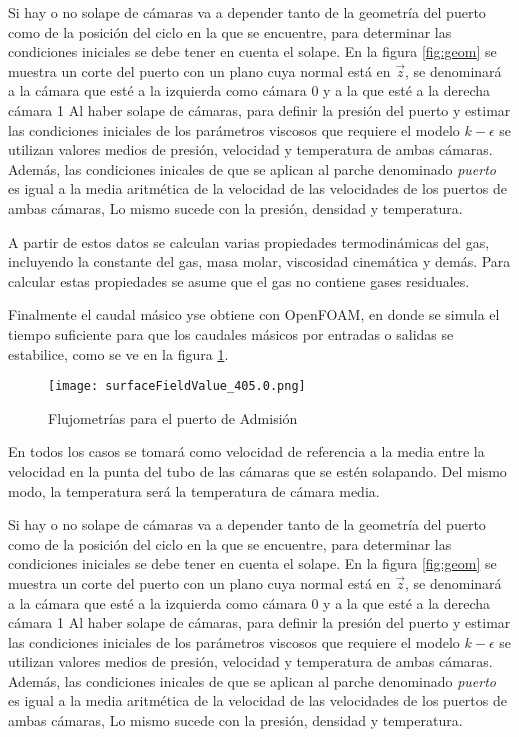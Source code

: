 Si hay o no solape de cámaras va a depender tanto de la geometría del puerto
como de la posición del ciclo en la que se encuentre, para determinar las
condiciones iniciales se debe tener en cuenta el solape.
%
En la figura \ref{fig:geom} se muestra un corte del puerto con un plano cuya
normal está en $\vec{z}$, se denominará a la cámara que esté a la izquierda
como cámara 0 y a la que esté a la derecha cámara 1
%
Al haber solape de cámaras, para definir la presión del puerto y estimar las
condiciones iniciales de los parámetros viscosos que requiere el modelo
$k-\epsilon$ se utilizan valores medios de presión, velocidad y temperatura de
ambas cámaras.
%
Además, las condiciones inicales de que se aplican al parche denominado
\emph{puerto} es igual a la media aritmética de la velocidad de las velocidades
de los puertos de ambas cámaras, Lo mismo sucede con la presión, densidad y
temperatura.

A partir de estos datos se calculan varias propiedades termodinámicas del gas,
incluyendo la constante del gas, masa molar, viscosidad cinemática y demás.
%
Para calcular estas propiedades se asume que el gas no contiene gases
residuales.

Finalmente el caudal másico yse obtiene con OpenFOAM, en donde se simula el
tiempo suficiente para que los caudales másicos por entradas o salidas se
estabilice, como se ve en la figura \ref{fig:caudalMasico}.

\begin{figure}
    \centering
    \texttt{[image: surfaceFieldValue\_405.0.png]}
    \caption{Flujometrías para el puerto de Admisión}
    \label{fig:caudalMasico}
\end{figure}
En todos los casos se tomará como velocidad de referencia a la media entre la
velocidad en la punta del tubo de las cámaras que se estén solapando.
%
Del mismo modo, la temperatura será la temperatura de cámara media.

Si hay o no solape de cámaras va a depender tanto de la geometría del puerto
como de la posición del ciclo en la que se encuentre, para determinar las
condiciones iniciales se debe tener en cuenta el solape.
%
En la figura \ref{fig:geom} se muestra un corte del puerto con un plano cuya
normal está en $\vec{z}$, se denominará a la cámara que esté a la izquierda
como cámara 0 y a la que esté a la derecha cámara 1
%
Al haber solape de cámaras, para definir la presión del puerto y estimar las
condiciones iniciales de los parámetros viscosos que requiere el modelo
$k-\epsilon$ se utilizan valores medios de presión, velocidad y temperatura de
ambas cámaras.
%
Además, las condiciones inicales de que se aplican al parche denominado
\emph{puerto} es igual a la media aritmética de la velocidad de las velocidades
de los puertos de ambas cámaras, Lo mismo sucede con la presión, densidad y
temperatura.



